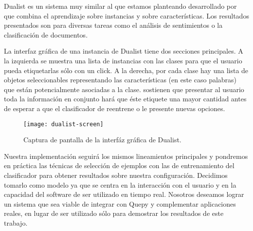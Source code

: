 Dualist es un sistema muy similar al que estamos planteando desarrollado por \citet{dualist} que combina el aprendizaje sobre instancias y sobre características. Los resultados presentados son para diversas tareas como el análisis de sentimientos o la clasificación de documentos.

La interfaz gráfica de una instancia de Dualist tiene dos secciones principales. A la izquierda se muestra una lista de instancias con las clases para que el usuario pueda etiquetarlas sólo con un click. A la derecha, por cada clase hay una lista de objetos seleccionables representando las características (en este caso palabras) que están potencialmente asociadas a la clase. \citet{dualist} sostienen que presentar al usuario toda la información en conjunto hará que éste etiquete una mayor cantidad antes de esperar a que el clasificador de reentrene o le presente nuevas opciones.

\begin{figure}[h!]
\caption{Captura de pantalla de la interfáz gráfica de Dualist.}
\texttt{[image: dualist-screen]}
\centering
\end{figure}

Nuestra implementación seguirá los mismos lineamientos principales y pondremos en práctica las técnicas de selección de ejemplos con las de entrenamiento del clasificador para obtener resultados sobre nuestra configuración. Decidimos tomarlo como modelo ya que se centra en la interacción con el usuario y en la capacidad del software de ser utilizado en tiempo real. Nosotros deseamos lograr un sistema que sea viable de integrar con Quepy y complementar aplicaciones reales, en lugar de ser utilizado sólo para demostrar los resultados de este trabajo.

